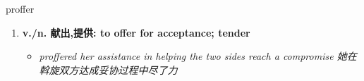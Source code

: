
\begin{frame}
{\huge proffer}
\begin{center}
\begin{enumerate}\Large
  \item \textbf{v./n. 献出,提供: to offer for acceptance; tender}
  \begin{itemize}
    \item \em{\Large{proffered her assistance in helping the two sides reach a compromise 她在斡旋双方达成妥协过程中尽了力}}
  \end{itemize}
\end{enumerate}
\end{center}
\end{frame}
